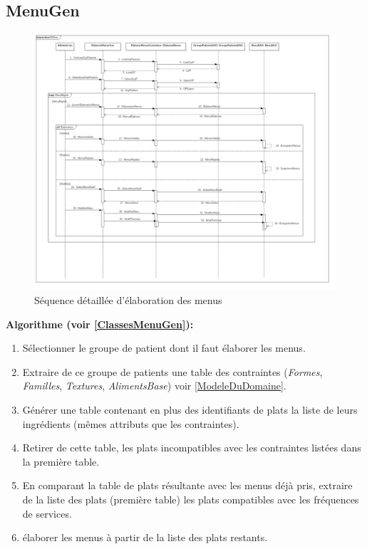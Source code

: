 \subsection{MenuGen}
\begin{figure}
  \centering
      \includegraphics[width=1.00\textwidth]{../../CasDUtilisations/MenuGen/Sequence/EMSeq.png} %
\caption{Séquence détaillée d'élaboration des menus}
\label{MenuGenSeqDetail}
\end{figure}

\textbf{Algorithme (voir \autoref{ClassesMenuGen}):}
\begin{enumerate}
\item Sélectionner le groupe de patient dont il faut élaborer les menus.
\item Extraire de ce groupe de patients une table des contraintes (\emph{Formes}, \emph{Familles}, \emph{Textures}, \emph{AlimentsBase}) voir \autoref{ModeleDuDomaine}.
\item Générer une table contenant en plus des identifiants de plats la liste de leurs ingrédients (mêmes attributs que les contraintes).
\item Retirer de cette table, les plats incompatibles avec les contraintes listées dans la première table.
\item En comparant la table de plats résultante avec les menus déjà pris, extraire de la liste des plats (première table) les plats compatibles avec les fréquences de services.
\item élaborer les menus à partir de la liste des plats restants.
\end{enumerate}


